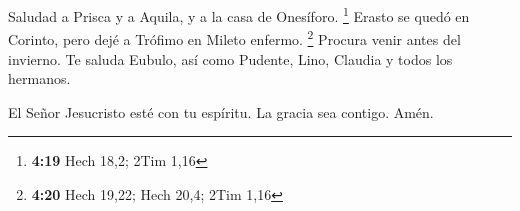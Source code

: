  Saludad a Prisca y a Aquila, y a la casa de Onesíforo.
\footnote{\textbf{4:19} Hech 18,2; 2Tim 1,16}  Erasto se
quedó en Corinto, pero dejé a Trófimo en Mileto enfermo. \footnote{\textbf{4:20}
  Hech 19,22; Hech 20,4; 2Tim 1,16}  Procura venir antes
del invierno. Te saluda Eubulo, así como Pudente, Lino, Claudia y todos
los hermanos.

 El Señor Jesucristo esté con tu espíritu. La gracia sea
contigo. Amén.
